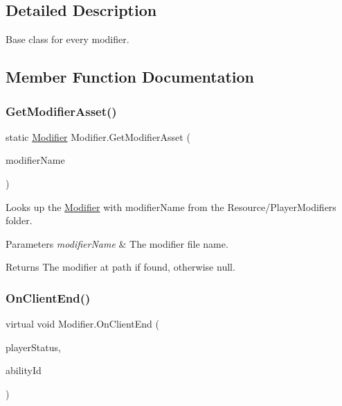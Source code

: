 \subsection{Detailed Description}
Base class for every modifier. 



\subsection{Member Function Documentation}
\hypertarget{class_modifier_a3112ab2082670bba7c86d2c77a3344fb}{}\label{class_modifier_a3112ab2082670bba7c86d2c77a3344fb} 
\subsubsection{\texorpdfstring{Get\+Modifier\+Asset()}{GetModifierAsset()}}
{\footnotesize\ttfamily static \hyperlink{class_modifier}{Modifier} Modifier.\+Get\+Modifier\+Asset (\begin{DoxyParamCaption}\item[{string}]{modifier\+Name }\end{DoxyParamCaption})\hspace{0.3cm}{\ttfamily [static]}}



Looks up the \hyperlink{class_modifier}{Modifier} with modifier\+Name from the Resource/\+Player\+Modifiers folder. 


\begin{DoxyParams}{Parameters}
{\em modifier\+Name} & The modifier file name.\\
\hline
\end{DoxyParams}
\begin{DoxyReturn}{Returns}
The modifier at path if found, otherwise null.
\end{DoxyReturn}
\hypertarget{class_modifier_af9a32f8313b83253dac318eed1ebd7ac}{}\label{class_modifier_af9a32f8313b83253dac318eed1ebd7ac} 
\subsubsection{\texorpdfstring{On\+Client\+End()}{OnClientEnd()}}
{\footnotesize\ttfamily virtual void Modifier.\+On\+Client\+End (\begin{DoxyParamCaption}\item[{\hyperlink{class_player_status}{Player\+Status}}]{player\+Status,  }\item[{int}]{ability\+Id }\end{DoxyParamCaption})\hspace{0.3cm}{\ttfamily [virtual]}}



